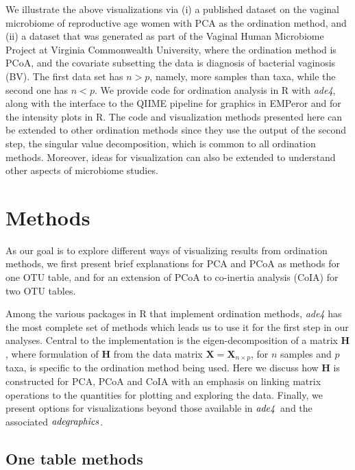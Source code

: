 \documentclass[doublespacing]{bmcart}
\def\H{\mathbf{H}}
\begin{document}
We illustrate the above visualizations via (i) a published dataset on the vaginal microbiome of reproductive age women \cite{Ravel} with PCA as the ordination method, and (ii) a dataset that was generated as part of the Vaginal Human Microbiome Project \cite{Fettweis} at Virginia Commonwealth University, where the ordination method is PCoA, and the covariate subsetting the data is diagnosis of bacterial vaginosis (BV). The first data set has $n > p$, namely, more samples than taxa, while the second one has $n < p$. We provide code for ordination analysis in R with {\it ade4}, along with the interface to the QIIME pipeline for graphics in EMPeror and for the intensity plots in R.  The code and visualization methods presented here can be extended to other ordination methods since they use the output of the second step, the singular value decomposition, which is common to all ordination methods. Moreover, ideas for visualization can also be extended to understand other aspects of microbiome studies. 

\section*{Methods}
As our goal is to explore different ways of visualizing results from ordination methods, we first present brief explanations for PCA and PCoA as methods for one OTU table, and for an extension of PCoA to co-inertia analysis (CoIA) for two OTU tables.

Among the various packages in R that implement ordination methods,  {\it ade4} \cite{Dray1, Dray2, Chessel} has the most complete set of methods which leads us to use it for the first step in our analyses. Central to the implementation is the eigen-decomposition of a matrix $\H$, where formulation of $\H$ from the data matrix $\mathbf{X}=\mathbf{X}_{n \times p}$, for $n$ samples and $p$ taxa, is specific to the ordination method being used. Here we discuss how $\H$ is constructed for PCA, PCoA and CoIA with an emphasis on linking matrix operations to the quantities for plotting and exploring the data. Finally, we present options for visualizations beyond those available in $\it ade4$ and the associated $\it adegraphics$. 
\subsection*{One table methods} 
\end{document}
